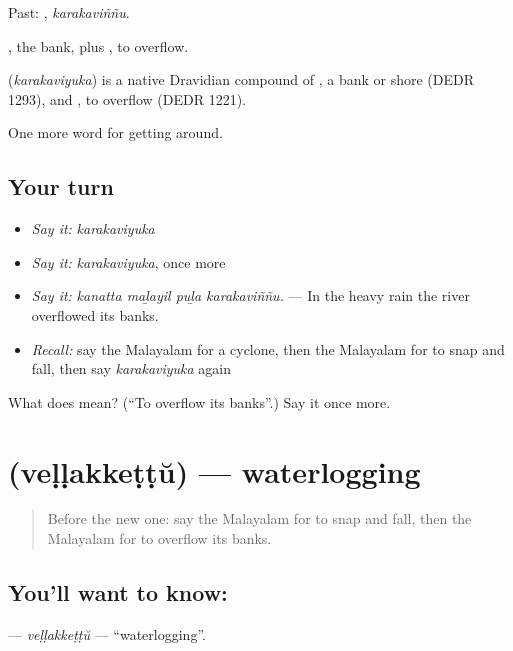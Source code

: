 Past: , \emph{karakaviññu}.

, the bank, plus , to overflow.

\begin{cousinweb}
\textbf{} (\emph{karakaviyuka}) is a native Dravidian compound of , a bank or shore (DEDR 1293), and , to overflow (DEDR 1221).
\end{cousinweb}

\begin{grammarlens}[title={What you've built}]
One more word for getting around.
\end{grammarlens}

\subsection*{Your turn}
\begin{itemize}
\raggedright
  \item \emph{Say it:} \emph{karakaviyuka}
  \item \emph{Say it:} \emph{karakaviyuka}, once more
  \item \emph{Say it:} \emph{kanatta maḻayil puḻa karakaviññu.} — In the heavy rain the river overflowed its banks.
  \item \emph{Recall:} say the Malayalam for a cyclone, then the Malayalam for to snap and fall, then say \emph{karakaviyuka} again
\end{itemize}

\begin{tcolorbox}[breakable,colback=teal!4,colframe=teal!35!black,title={Before you move on}]
What does  mean? (\textquotedblleft{}To overflow its banks\textquotedblright{}.) Say it once more.
\end{tcolorbox}
\section[\texorpdfstring{\ml{വെള്ളക്കെട്ട്} (veḷḷakkeṭṭŭ)}{വെള്ളക്കെട്ട് (veḷḷakkeṭṭŭ)}]{ (veḷḷakkeṭṭŭ) — waterlogging}

\label{lesson:ML-C512-vellakkettu}



\begin{quote}
Before the new one: say the Malayalam for to snap and fall, then the Malayalam for to overflow its banks.
\end{quote}

\subsection*{You'll want to know: }
\textbf{} — \emph{veḷḷakkeṭṭŭ} — \textquotedblleft{}waterlogging\textquotedblright{}.

